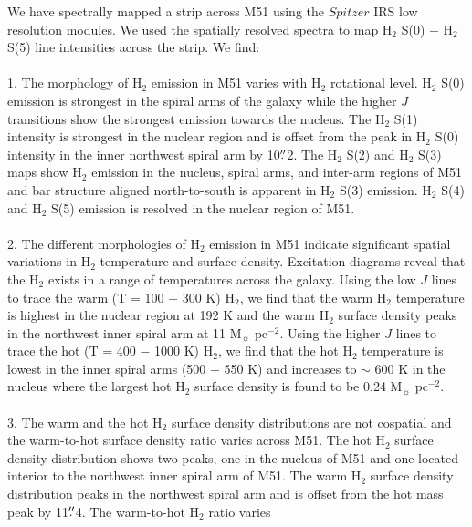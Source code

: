 \documentclass[manuscript]{aastex}
\begin{document}
We have spectrally mapped a strip across M51 using the $Spitzer$ IRS
low resolution modules.  We used the spatially resolved spectra to map
$\mathrm{H_2}$ S(0) $-$ $\mathrm{H_2}$ S(5) line intensities across
the strip.  We find:\\
\\
1.  The morphology of $\mathrm{H_2}$
emission in M51 varies with $\mathrm{H_2}$ rotational level.
$\mathrm{H_2}$ S(0) emission is strongest in the spiral arms of the
galaxy while the higher $J$ transitions show the strongest emission
towards the nucleus.  The $\mathrm{H_2}$ S(1) intensity is strongest
in the nuclear region and is offset from the peak in H$_2$ S(0) 
intensity in the inner northwest spiral arm by 10$\mbox{$.\!\!^{\prime\prime}$}$2.
The $\mathrm{H_2}$ S(2) and $\mathrm{H_2}$ S(3) maps show
$\mathrm{H_2}$ emission in the nucleus, spiral arms, and inter-arm
regions of M51 and bar structure aligned north-to-south is apparent in
$\mathrm{H_2}$ S(3) emission.  $\mathrm{H_2}$ S(4) and $\mathrm{H_2}$
S(5) emission is resolved in the nuclear region of M51.\\
\\
2.  The different morphologies of $\mathrm{H_2}$ emission in M51
indicate significant spatial variations in $\mathrm{H_2}$
temperature and surface density.  Excitation diagrams reveal that the
$\mathrm{H_2}$ exists in a range of temperatures
across the galaxy.  Using the low $J$ lines to trace the warm (T = 100
$-$ 300 K) $\mathrm{H_2}$, we find that the warm $\mathrm{H_2}$
temperature is highest in the nuclear region at 192 K and
the warm $\mathrm{H_2}$ surface density peaks in the northwest inner spiral arm
at 11 $\mathrm{M_\sun}$ $\mathrm{pc^{-2}}$.  Using the
higher $J$ lines to trace the hot (T = 400 $-$ 1000 K) $\mathrm{H_2}$,
we find that the hot $\mathrm{H_2}$ temperature is lowest
in the inner spiral arms (500 $-$ 550 K) and increases to $\sim$ 600 K
in the nucleus where the largest hot $\mathrm{H_2}$ surface density
is found to be 0.24 $\mathrm{M_\sun}$ $\mathrm{pc^{-2}}$.\\
\\
3.  The warm and the hot $\mathrm{H_2}$ surface density distributions are not
cospatial and the warm-to-hot surface density ratio varies across M51.  The hot
H$_2$ surface density distribution shows two peaks, one in the nucleus of M51 and one
located interior to the northwest inner spiral arm of M51.  The warm
H$_2$ surface density distribution peaks in the northwest spiral arm and is offset from
the hot mass peak by 11$\mbox{$.\!\!^{\prime\prime}$}$4.  The warm-to-hot H$_2$ ratio varies
\end{document}

